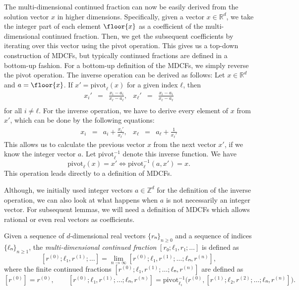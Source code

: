 The multi-dimensional continued fraction can now be easily derived from the
solution vector $x$ in higher dimensions.
Specifically, given a vector $x ∈ ℝ^d$, we take the integer part of each
element $\floor{x}$ as a coefficient of the multi-dimensional continued
fraction.
Then, we get the subsequent coefficients by iterating over this vector using
the pivot operation.
This gives us a top-down construction of MDCFs, but typically continued
fractions are defined in a bottom-up fashion.
For a bottom-up definition of the MDCFs, we simply reverse the pivot operation.
The inverse operation can be derived as follows:
Let $x ∈ ℝ^d$ and $a = \floor{x}$.
If $x' = \mathrm{pivot}_ℓ(x)$ for a given index $ℓ$, then
\[
  \begin{array}{lcrlcr}
    \displaystyle x_i' & = & \displaystyle \frac{x_i - a_i}{x_ℓ - a_ℓ}, &
    \displaystyle x_ℓ' & = & \displaystyle \frac{x_i - a_i}{x_ℓ - a_ℓ} \\[1em]
  \end{array}
\]
for all $i ≠ ℓ$.
For the inverse operation, we have to derive every element of $x$ from $x'$,
which can be done by the following equations:
\[
  \begin{array}{lcrlcr}
    \displaystyle x_i & = & a_i + \displaystyle \frac{x_i'}{x_ℓ'}, &
    \displaystyle x_ℓ & = & a_ℓ + \displaystyle \frac{1}{x_ℓ'}
  \end{array}
\]
This allows us to calculate the previous vector $x$ from the next vector $x'$,
if we know the integer vector $a$.
Let $\mathrm{pivot}_ℓ^{-1}$ denote this inverse function.
We have
\[
  \mathrm{pivot}_ℓ(x) = x' \iff \mathrm{pivot}_ℓ^{-1}(a, x') = x.
\]
This operation leads directly to a definition of MDCFs.

Although, we initially used integer vectors $a ∈ ℤ^d$ for the definition of the inverse operation,
we can also look at what happens when $a$ is not necessarily an integer vector.
For subsequent lemmas, we will need a definition of MDCFs which allows rational
or even real vectors as coefficients.

\begin{definition}
  Given a sequence of $d$-dimensional real vectors $\{rₙ\}_{n ≥ 0}$ and a sequence of
  indices $\{ℓₙ\}_{n ≥ 1}$, the \emph{multi-dimensional continued fraction} $[r₀; ℓ₁, r₁; …]$
  is defined as
  \[
    [r^{(0)}; ℓ₁, r^{(1)}; …] = \lim_{n → ∞} [r^{(0)}; ℓ₁, r^{(1)}; …; ℓₙ, r^{(n)}],
  \]
  where the finite continued fractions $[r^{(0)}; ℓ₁, r^{(1)}; …; ℓₙ, r^{(n)}]$ are defined as
  \[
    [r^{(0)}] = r^{(0)},
    \qquad
    [r^{(0)}; ℓ₁, r^{(1)}; …; ℓₙ, r^{(n)}]
    = \mathrm{pivot}_{ℓ₁}^{-1}\big(r^{(0)}, [r^{(1)}; ℓ₂, r^{(2)}; …; ℓₙ, r^{(n)}]\big).
  \]
\end{definition}

